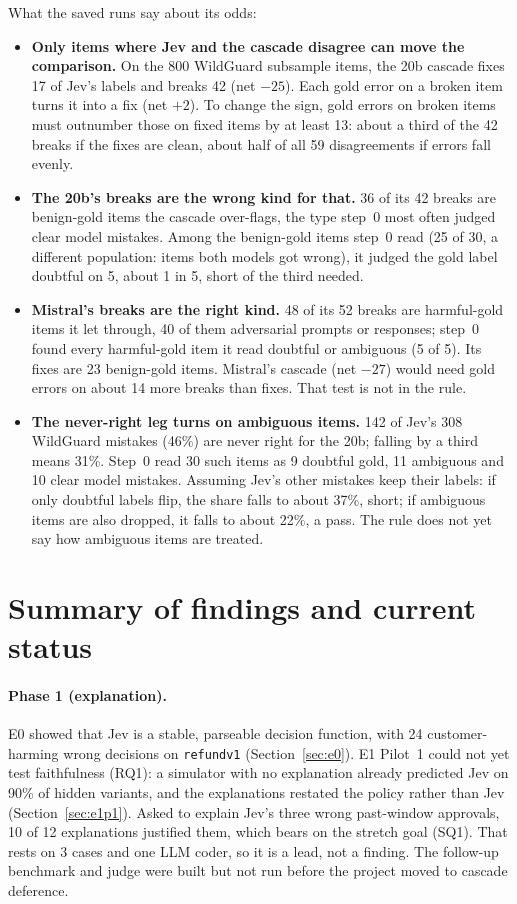 \documentclass[11pt]{article}
\renewcommand{\_}{\origunderscore\allowbreak}
\begin{document}
What the saved runs say about its odds:
\begin{itemize}[leftmargin=*]
  \item \textbf{Only items where Jev and the cascade disagree can move the comparison.} On the 800 WildGuard subsample items, the 20b cascade fixes 17 of Jev's labels and breaks 42 (net $-25$). Each gold error on a broken item turns it into a fix (net $+2$). To change the sign, gold errors on broken items must outnumber those on fixed items by at least 13: about a third of the 42 breaks if the fixes are clean, about half of all 59 disagreements if errors fall evenly.
  \item \textbf{The 20b's breaks are the wrong kind for that.} 36 of its 42 breaks are benign-gold items the cascade over-flags, the type step~0 most often judged clear model mistakes. Among the benign-gold items step~0 read (25 of 30, a different population: items both models got wrong), it judged the gold label doubtful on 5, about 1 in 5, short of the third needed.
  \item \textbf{Mistral's breaks are the right kind.} 48 of its 52 breaks are harmful-gold items it let through, 40 of them adversarial prompts or responses; step~0 found every harmful-gold item it read doubtful or ambiguous (5 of 5). Its fixes are 23 benign-gold items. Mistral's cascade (net $-27$) would need gold errors on about 14 more breaks than fixes. That test is not in the rule.
  \item \textbf{The never-right leg turns on ambiguous items.} 142 of Jev's 308 WildGuard mistakes (46\%) are never right for the 20b; falling by a third means 31\%. Step~0 read 30 such items as 9 doubtful gold, 11 ambiguous and 10 clear model mistakes. Assuming Jev's other mistakes keep their labels: if only doubtful labels flip, the share falls to about 37\%, short; if ambiguous items are also dropped, it falls to about 22\%, a pass. The rule does not yet say how ambiguous items are treated.
\end{itemize}

\section{Summary of findings and current status}\label{sec:conclusion}

\paragraph{Phase 1 (explanation).} E0 showed that Jev is a stable, parseable decision function, with 24 customer-harming wrong decisions on \texttt{refund\_v1} (Section~\ref{sec:e0}). E1 Pilot~1 could not yet test faithfulness (RQ1): a simulator with no explanation already predicted Jev on 90\% of hidden variants, and the explanations restated the policy rather than Jev (Section~\ref{sec:e1p1}). Asked to explain Jev's three wrong past-window approvals, 10 of 12 explanations justified them, which bears on the stretch goal (SQ1). That rests on 3 cases and one LLM coder, so it is a lead, not a finding. The follow-up benchmark and judge were built but not run before the project moved to cascade deference.
\end{document}
